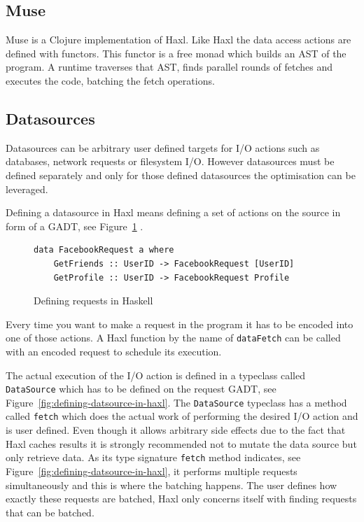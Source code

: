 \subsection{Muse}

Muse\cite{Muse:repository:link} is a Clojure implementation of Haxl.
Like Haxl the data access actions are defined with functors.
This functor is a free monad\cite{free-monad} which builds an AST of the program.
A runtime traverses that AST, finds parallel rounds of fetches and executes the code, batching the fetch operations.

\subsection{Datasources}

\label{subs:datasources}

Datasources can be arbitrary user defined targets for I/O actions such as databases, network requests or filesystem I/O.
However datasources must be defined separately and only for those defined datasources the optimisation can be leveraged.

Defining a datasource in Haxl means defining a set of actions on the source in form of a GADT\cite{PeytonJones:2006:SUT:1160074.1159811}, see Figure~\ref{fig:defining-requests-in-haxl} .

\begin{figure}
\begin{verbatim}
data FacebookRequest a where
    GetFriends :: UserID -> FacebookRequest [UserID]
    GetProfile :: UserID -> FacebookRequest Profile
\end{verbatim}
\caption{Defining requests in Haskell}
\label{fig:defining-requests-in-haxl}
\end{figure}


Every time you want to make a request in the program it has to be encoded into one of those actions.
A Haxl function by the name of \texttt{dataFetch} can be called with an encoded request to schedule its execution.

The actual execution of the I/O action is defined in a typeclass\cite{type-classes} called \texttt{DataSource} which has to be defined on the request GADT, see Figure~\ref{fig:defining-datsource-in-haxl}.
The \texttt{DataSource} typeclass has a method called \texttt{fetch} which does the actual work of performing the desired I/O action and is user defined.
Even though it allows arbitrary side effects due to the fact that Haxl caches results it is strongly recommended not to mutate the data source but only retrieve data.
As its type signature \texttt{fetch} method indicates, see  Figure~\ref{fig:defining-datsource-in-haxl}, it performs multiple requests simultaneously and this is where the batching happens.
The user defines how exactly these requests are batched, Haxl only concerns itself with finding requests that can be batched.

